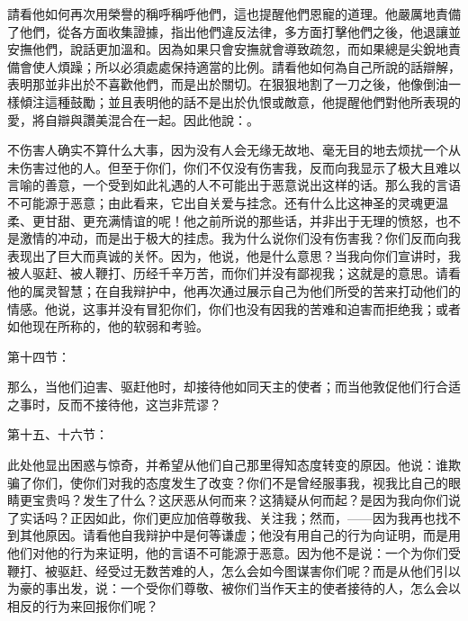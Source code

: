 \par

請看他如何再次用榮譽的稱呼稱呼他們，這也提醒他們恩寵的道理。他嚴厲地責備了他們，從各方面收集證據，指出他們違反法律，多方面打擊他們之後，他退讓並安撫他們，說話更加溫和。因為如果只會安撫就會導致疏忽，而如果總是尖銳地責備會使人煩躁；所以必須處處保持適當的比例。請看他如何為自己所說的話辯解，表明那並非出於不喜歡他們，而是出於關切。在狠狠地割了一刀之後，他像倒油一樣傾注這種鼓勵；並且表明他的話不是出於仇恨或敵意，他提醒他們對他所表現的愛，將自辯與讚美混合在一起。因此他說：。\par

\par

不伤害人确实不算什么大事，因为没有人会无缘无故地、毫无目的地去烦扰一个从未伤害过他的人。但至于你们，你们不仅没有伤害我，反而向我显示了极大且难以言喻的善意，一个受到如此礼遇的人不可能出于恶意说出这样的话。那么我的言语不可能源于恶意；由此看来，它出自关爱与挂念。还有什么比这神圣的灵魂更温柔、更甘甜、更充满情谊的呢！他之前所说的那些话，并非出于无理的愤怒，也不是激情的冲动，而是出于极大的挂虑。我为什么说你们没有伤害我？你们反而向我表现出了巨大而真诚的关怀。因为，他说，他是什么意思？当我向你们宣讲时，我被人驱赶、被人鞭打、历经千辛万苦，而你们并没有鄙视我；这就是的意思。请看他的属灵智慧；在自我辩护中，他再次通过展示自己为他们所受的苦来打动他们的情感。他说，这事并没有冒犯你们，你们也没有因我的苦难和迫害而拒绝我；或者如他现在所称的，他的软弱和考验。\par

第十四节：\par

那么，当他们迫害、驱赶他时，却接待他如同天主的使者；而当他敦促他们行合适之事时，反而不接待他，这岂非荒谬？\par

第十五、十六节：\par

此处他显出困惑与惊奇，并希望从他们自己那里得知态度转变的原因。他说：谁欺骗了你们，使你们对我的态度发生了改变？你们不是曾经服事我，视我比自己的眼睛更宝贵吗？发生了什么？这厌恶从何而来？这猜疑从何而起？是因为我向你们说了实话吗？正因如此，你们更应加倍尊敬我、关注我；然而，——因为我再也找不到其他原因。请看他自我辩护中是何等谦虚；他没有用自己的行为向证明，而是用他们对他的行为来证明，他的言语不可能源于恶意。因为他不是说：一个为你们受鞭打、被驱赶、经受过无数苦难的人，怎么会如今图谋害你们呢？而是从他们引以为豪的事出发，说：一个受你们尊敬、被你们当作天主的使者接待的人，怎么会以相反的行为来回报你们呢？\par


